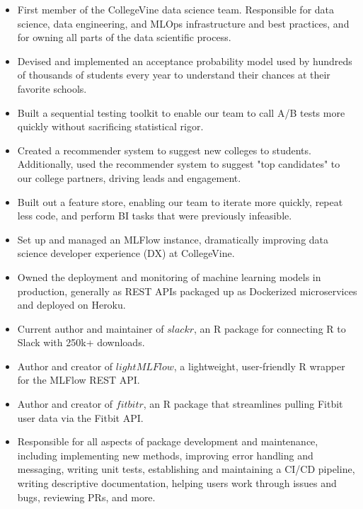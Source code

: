 \documentclass[10pt,a4paper,ragged2e,withhyper]{/Users/matt/documents/GitHub/mrkaye97.github.io/resume/altacv}
\begin{document}
	


	 \makecvheader
		
	
		\begin{itemize}
		\item First member of the CollegeVine data science team.  Responsible for data science, data engineering, and MLOps infrastructure and best practices, and for owning all parts of the data scientific process.
		\item Devised and implemented an acceptance probability model used by hundreds of thousands of students every year to understand their chances at their favorite schools.
		\item Built a sequential testing toolkit to enable our team to call A/B tests more quickly without sacrificing statistical rigor.
		\item Created a recommender system to suggest new colleges to students. Additionally, used the recommender system to suggest "top candidates" to our college partners, driving leads and engagement.
		\item Built out a feature store, enabling our team to iterate more quickly, repeat less code, and perform BI tasks that were previously infeasible.
		\item Set up and managed an MLFlow instance,  dramatically improving data science developer experience (DX) at CollegeVine.
		\item Owned the deployment and monitoring of machine learning models in production, generally as REST APIs packaged up as Dockerized microservices and deployed on Heroku.
		\end{itemize}
		
		\divider
		
		
		\begin{itemize}
		\item Current author and maintainer of $slackr$, an R package for connecting R to Slack with 250k+ downloads.
		\item Author and creator of $lightMLFlow$, a lightweight, user-friendly R wrapper for the MLFlow REST API.
		\item Author and creator of $fitbitr$, an R package that streamlines pulling Fitbit user data via the Fitbit API.
		\item Responsible for all aspects of package development and maintenance, including implementing new methods, improving error handling and messaging, writing unit tests, establishing and maintaining a CI/CD pipeline, writing descriptive documentation, helping users work through issues and bugs, reviewing PRs, and more.
		\end{itemize}
		
\end{document}
